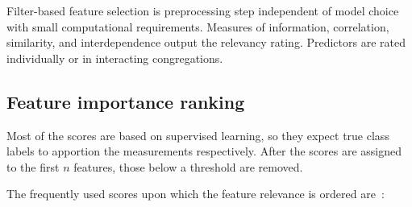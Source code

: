 Filter-based feature selection is preprocessing step independent of model choice with small computational requirements. Measures of information, correlation, similarity, and interdependence output the relevancy rating. Predictors are rated individually or in interacting congregations. 

\subsection{Feature importance ranking}
Most of the scores are based on supervised learning, so they expect true class labels to apportion the measurements respectively. After the scores are assigned to the first $n$ features, those below a threshold are removed. 

The frequently used scores upon which the feature relevance is ordered are~\cite{nandi_condition_2019}: 

